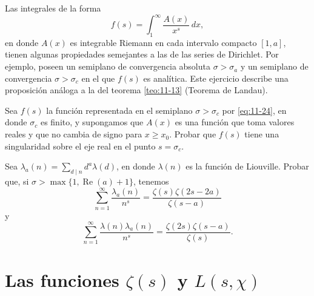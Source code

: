 \documentclass[12pt,a4paper]{book}
\begin{document}
    \begin{ejercicio}
        Las integrales de la forma
        \begin{equation}\label{eq:11-24}
            f(s)=\int_{1}^{\infty}\frac{A(x)}{x^{s}}\,dx,
        \end{equation}
        en donde $A(x)$ es integrable Riemann en cada intervalo compacto $[1,a]$, tienen algunas
        propiedades semejantes a las de las series de Dirichlet. Por ejemplo, poseen un
        semiplano de convergencia absoluta $\sigma>\sigma_{a}$ y un semiplano de convergencia
        $\sigma>\sigma_{c}$ en el que $f(s)$ es analítica. Este ejercicio describe una
        proposición análoga a la del teorema \ref{teo:11-13} (Teorema de Landau).

        Sea $f(s)$ la función representada en el semiplano $\sigma>\sigma_{c}$ por
        \eqref{eq:11-24}, en donde $\sigma_{c}$ es finito, y supongamos que $A(x)$ es una función
        que toma valores reales y que no cambia de signo para $x\geq x_{0}$. Probar que $f(s)$
        tiene una singularidad sobre el eje real en el punto $s=\sigma_{c}$.
    \end{ejercicio}

    \begin{ejercicio}
        Sea $\lambda_{a}(n)=\sum_{d\mid n}d^{a}\lambda(d)$, en donde $\lambda(n)$ es la función de
        Liouville. Probar que, si $\sigma>\max\{1,\operatorname{Re}(a)+1\}$, tenemos
        \begin{equation*}
            \sum_{n=1}^{\infty}\frac{\lambda_{a}(n)}{n^{s}}=\frac{\zeta(s)\zeta(2s-2a)}{\zeta(s-a)}
        \end{equation*}
        y
        \begin{equation*}
            \sum_{n=1}^{\infty}\frac{\lambda(n)\lambda_{a}(n)}{n^{s}}=\frac{\zeta(2s)\zeta(s-a)}{\zeta(s)}.
        \end{equation*}
    \end{ejercicio}

\chapter{Las funciones \texorpdfstring{$\zeta(s)$}{ζ(s)} y \texorpdfstring{$L(s,\chi)$}{L(s,χ)}}
\end{document}
